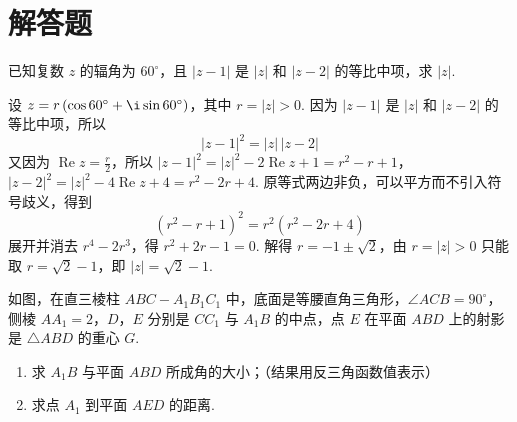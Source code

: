 \section{解答题}
\begin{problem}
已知复数 \(z\) 的辐角为 \(60^{\circ}\)，且 \(|z - 1|\) 是 \(|z|\) 和 \(|z - 2|\) 的等比中项，求 \(|z|\).
\end{problem}

\begin{solution}
设 \(z=r\left(\cos60^{\circ}+\i\sin60^{\circ}\right)\)，其中 \(r=|z|>0\). 因为 \(|z-1|\) 是 \(|z|\) 和 \(|z-2|\) 的等比中项，所以
\[
|z-1|^2=|z|\,|z-2|
\]
又因为 \(\operatorname{Re}z=\frac r2\)，所以
\(|z-1|^2=|z|^2-2\operatorname{Re}z+1=r^2-r+1\)，\(|z-2|^2=|z|^2-4\operatorname{Re}z+4=r^2-2r+4\).
原等式两边非负，可以平方而不引入符号歧义，得到
\[
(r^2-r+1)^2=r^2(r^2-2r+4)
\]
展开并消去 \(r^4-2r^3\)，得 \(r^2+2r-1=0\). 解得 \(r=-1\pm\sqrt2\)，由 \(r=|z|>0\) 只能取 \(r=\sqrt2-1\)，即 \(|z|=\sqrt2-1\).
\end{solution}

\begin{problem}
如图，在直三棱柱 \(ABC - A_{1}B_{1}C_{1}\) 中，底面是等腰直角三角形，\(\angle ACB = 90^{\circ}\)，侧棱 \(AA_{1} = 2\)，\(D\)，\(E\) 分别是 \(CC_{1}\) 与 \(A_{1}B\) 的中点，点 \(E\) 在平面 \(ABD\) 上的射影是 \(\triangle ABD\) 的重心 \(G\).

\begin{enumerate}
\item 求 \(A_{1}B\) 与平面 \(ABD\) 所成角的大小；（结果用反三角函数值表示）
\item 求点 \(A_{1}\) 到平面 \(AED\) 的距离.
\end{enumerate}

\FloatBarrier
\end{problem}

